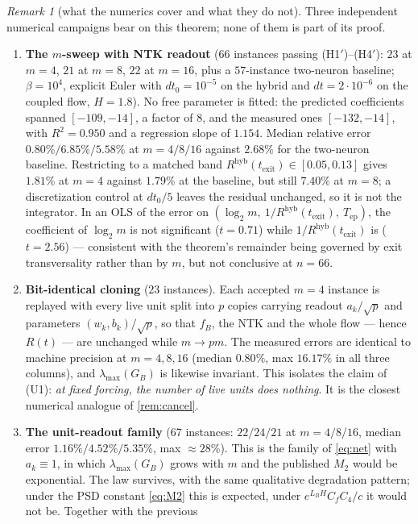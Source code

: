 \documentclass[11pt]{article}
\theoremstyle{definition}
\theoremstyle{remark}
\newtheorem{remark}{Remark}
\newcommand{\hyb}{\mathrm{hyb}}
\newcommand{\texit}{t_{\mathrm{exit}}}
\newcommand{\Tep}{T_{\mathrm{ep}}}
\begin{document}
\begin{remark}[what the numerics cover and what they do not]\label{rem:numerics}
Three independent numerical campaigns bear on this theorem; none of them is part
of its proof.
\begin{enumerate}
\item \textbf{The $m$-sweep with NTK readout} ($66$ instances passing
(H1$'$)--(H4$'$): $23$ at $m=4$, $21$ at $m=8$, $22$ at $m=16$, plus a
$57$-instance two-neuron baseline; $\beta=10^4$, explicit Euler with
$dt_0=10^{-5}$ on the hybrid and $dt=2\cdot10^{-6}$ on the coupled flow,
$H=1.8$). No free parameter is fitted: the predicted coefficients spanned
$[-109,-14]$, a factor of $8$, and the measured ones $[-132,-14]$, with
$R^2=0.950$ and a regression slope of $1.154$. Median relative error
$0.80\%/6.85\%/5.58\%$ at $m=4/8/16$ against $2.68\%$ for the two-neuron
baseline. Restricting to a matched band $R^{\hyb}(\texit)\in[0.05,0.13]$ gives
$1.81\%$ at $m=4$ against $1.79\%$ at the baseline, but still $7.40\%$ at $m=8$;
a discretization control at $dt_0/5$ leaves the residual unchanged, so it is not
the integrator. In an OLS of the error on $(\log_2m,\ 1/R^{\hyb}(\texit),\
\Tep)$, the coefficient of $\log_2m$ is not significant ($t=0.71$) while
$1/R^{\hyb}(\texit)$ is ($t=2.56$) --- consistent with the theorem's remainder
being governed by exit transversality rather than by $m$, but not conclusive at
$n=66$.
\item \textbf{Bit-identical cloning} ($23$ instances). Each accepted $m=4$
instance is replayed with every live unit split into $p$ copies carrying readout
$a_k/\sqrt p$ and parameters $(w_k,b_k)/\sqrt p$, so that $f_B$, the NTK and the
whole flow --- hence $R(t)$ --- are unchanged while $m\to pm$. The measured
errors are identical to machine precision at $m=4,8,16$ (median $0.80\%$, max
$16.17\%$ in all three columns), and $\lambda_{\max}(G_B)$ is likewise invariant.
This isolates the claim of (U1): \emph{at fixed forcing, the number of live units
does nothing}. It is the closest numerical analogue of \cref{rem:cancel}.
\item \textbf{The unit-readout family} ($67$ instances: $22/24/21$ at
$m=4/8/16$, median error $1.16\%/4.52\%/5.35\%$, max $\approx28\%$). This is the
family of \eqref{eq:net} with $a_k\equiv1$, in which $\lambda_{\max}(G_B)$ grows
with $m$ and the published $M_2$ would be exponential. The law survives, with the
same qualitative degradation pattern; under the PSD constant \eqref{eq:M2} this
is expected, under $e^{L_BH}C_fC_4/c$ it would not be. Together with the previous

\end{enumerate}
\end{remark}
\end{document}
